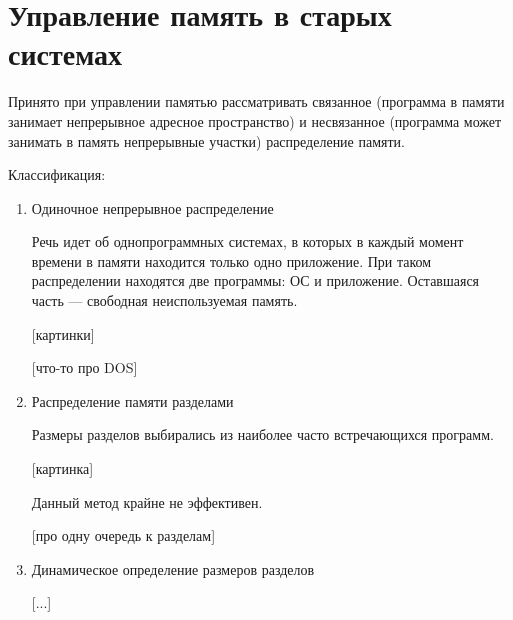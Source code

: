 \documentclass[a4paper, 14pt]{extreport}
\begin{document}
	\section{Управление память в старых системах}
	
	Принято при управлении памятью рассматривать связанное (программа в памяти занимает непрерывное адресное пространство) и несвязанное (программа может занимать в память непрерывные участки) распределение памяти.
	
	Классификация:
	
	\begin{enumerate}
		\item Одиночное непрерывное распределение
		
		Речь идет об однопрограммных системах, в которых в каждый момент времени в памяти находится только одно приложение. При таком распределении находятся две программы: ОС и приложение. Оставшаяся часть --- свободная неиспользуемая память.
		
		[картинки]
		
		[что-то про DOS]
		
		\item Распределение памяти разделами
		
		Размеры разделов выбирались из наиболее часто встречающихся программ.
		
		[картинка]
		
		Данный метод крайне не эффективен.
		
		[про одну очередь к разделам]
		
		\item Динамическое определение размеров разделов
		
		[...]
		
		
	\end{enumerate}
\end{document}
